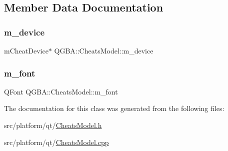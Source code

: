 \subsection{Member Data Documentation}
\mbox{\label{class_q_g_b_a_1_1_cheats_model_ac06665c1e57cc1b07916887eef1e0352}} 
\subsubsection{\texorpdfstring{m\+\_\+device}{m\_device}}
{\footnotesize\ttfamily m\+Cheat\+Device$\ast$ Q\+G\+B\+A\+::\+Cheats\+Model\+::m\+\_\+device\hspace{0.3cm}{\ttfamily [private]}}

\mbox{\label{class_q_g_b_a_1_1_cheats_model_adf770872dfc5a1ff2c47e3b855764008}} 
\subsubsection{\texorpdfstring{m\+\_\+font}{m\_font}}
{\footnotesize\ttfamily Q\+Font Q\+G\+B\+A\+::\+Cheats\+Model\+::m\+\_\+font\hspace{0.3cm}{\ttfamily [private]}}



The documentation for this class was generated from the following files\+:\begin{DoxyCompactItemize}
\item 
src/platform/qt/\mbox{\hyperlink{_cheats_model_8h}{Cheats\+Model.\+h}}\item 
src/platform/qt/\mbox{\hyperlink{_cheats_model_8cpp}{Cheats\+Model.\+cpp}}\end{DoxyCompactItemize}
